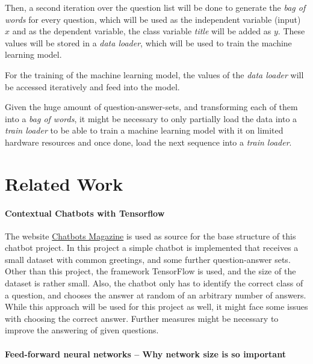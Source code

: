         Then, a second iteration over the question list will be done to generate the \emph{bag of words} for every question, which will be used as the independent variable (input) $x$ and as the dependent variable, the class variable \emph{title} will be added as $y$. 
        These values will be stored in a \emph{data loader}, which will be used to train the machine learning model.

        For the training of the machine learning model, the values of the \emph{data loader} will be accessed iteratively and feed into the model.
        
        Given the huge amount of question-answer-sets, and transforming each of them into a \emph{bag of words}, it might be necessary to only partially load the data into a \emph{train loader} to be able to train a machine learning model with it on limited hardware resources and once done, load the next sequence into a \emph{train loader}.


\section{Related Work}
\label{sec:related-work}
    
        \paragraph{Contextual Chatbots with Tensorflow \cite{chatbottensorflow}}
        \label{par:-contextual-chatbot-tensorflow}

            The website \href{https://chatbotsmagazine.com/contextual-chat-bots-with-tensorflow-4391749d0077}{Chatbots Magazine} is used as source for the base structure of this chatbot project.
            In this project a simple chatbot is implemented that receives a small dataset with common greetings, and some further question-answer sets.
            Other than this project, the framework TensorFlow is used, and the size of the dataset is rather small.
            Also, the chatbot only has to identify the correct class of a question, and chooses the answer at random of an arbitrary number of answers.
            While this approach will be used for this project as well, it might face some issues with choosing the correct answer. Further measures might be necessary to improve the answering of given questions.
            
            
        \paragraph{Feed-forward neural networks -- Why network size is so important}
        \label{par:feed-forward-neural-networks}
            
